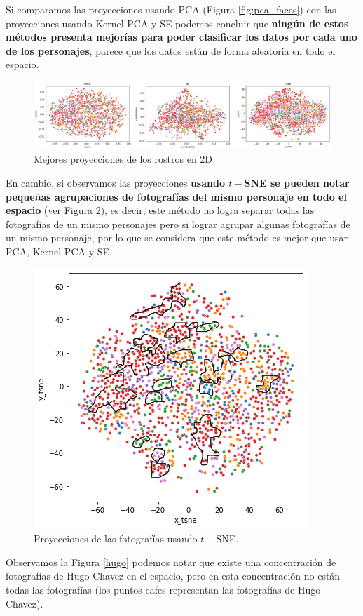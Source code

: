 \documentclass[paper=letter, fontsize=11pt]{scrartcl}
\numberwithin{equation}{section} %
\numberwithin{figure}{section} %
\numberwithin{table}{section} %
\begin{document}
Si comparamos las proyecciones usando PCA (Figura \ref{fig:pca_faces}) con las proyecciones usando Kernel PCA y SE podemos concluir que \textbf{ningún de estos métodos presenta mejorías para poder clasificar los datos por cada uno de los personajes}, parece que los datos están de forma aleatoria en todo el espacio. 
\begin{figure}[H]
    \centering
    \includegraphics[scale=0.36]{figure/resultados_faces.png}
    \caption{Mejores proyecciones de los rostros en 2D}
    \label{fig:resultados_faces}
\end{figure}
En cambio, si observamos las proyecciones \textbf{usando $t-$SNE se pueden notar pequeñas agrupaciones de fotografías del mismo personaje en todo el espacio} (ver Figura \ref{fig:tsne_final}), es decir, este método no logra separar todas las fotografías de un mismo personajes pero si lograr agrupar algunas fotografías de un mismo personaje, por lo que se considera que este método es mejor que usar PCA, Kernel PCA y SE.
\begin{figure}[H]
    \centering
    \includegraphics[scale=0.7]{figure/tsne_final.png}
    \caption{Proyecciones de las fotografías usando $t-$SNE.}
    \label{fig:tsne_final}
\end{figure}
Observamos la Figura \ref{hugo} podemos notar que existe una concentración de fotografías de Hugo Chavez en el espacio, pero en esta concentración no están todas las fotografías (los puntos cafes representan las fotografías de Hugo Chavez). 
\end{document}
